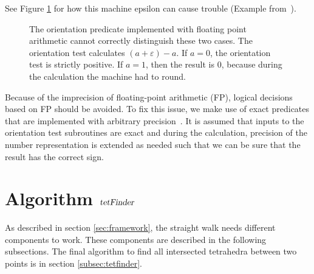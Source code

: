\documentclass[../thesis.tex]{subfiles}
\begin{document}
See Figure \ref{fig:floatingpoint} for how this machine epsilon can cause trouble (Example from~\cite{Marek}).
\begin{figure}[htb]
  \centering
  \def\svgwidth{20em}
  
  \caption{The orientation predicate implemented with floating point arithmetic cannot correctly distinguish these two cases.
  The orientation test calculates $(a+\varepsilon)-a$. If $a=0$, the orientation test is strictly positive.
  If $a=1$, then the result is $0$, because during the calculation the machine had to round.
  }\label{fig:floatingpoint}
\end{figure}
Because of the imprecision of floating-point arithmetic (FP), logical decisions
based on FP should be avoided.
To fix this issue, we make use of exact predicates that are implemented with arbitrary precision~\cite{RichardShewchuk1997}.
It is assumed that inputs to the orientation test subroutines are exact and during the calculation,
precision of the number representation is extended as needed such that
we can be sure that the result has the correct sign.


\section{Algorithm $\textsl{tetFinder}$}
As described in section \ref{sec:framework}, the straight walk needs different
components to work. These components are described in the following subsections.
The final algorithm to find all intersected tetrahedra between two points is in section \ref{subsec:tetfinder}.
\end{document}
